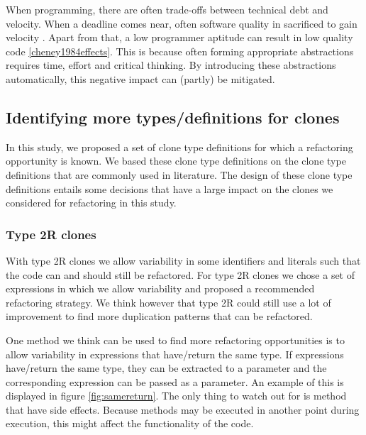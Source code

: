 When programming, there are often trade-offs between technical debt and velocity. When a deadline comes near, often software quality in sacrificed to gain velocity \cite{costello1984software, austin2001effects, shah2014global}. Apart from that, a low programmer aptitude can result in low quality code \ref{cheney1984effects}. This is because often forming appropriate abstractions requires time, effort and critical thinking. By introducing these abstractions automatically, this negative impact can (partly) be mitigated.

\subsection{Identifying more types/definitions for clones}
In this study, we proposed a set of clone type definitions for which a refactoring opportunity is known. We based these clone type definitions on the clone type definitions that are commonly used in literature. The design of these clone type definitions entails some decisions that have a large impact on the clones we considered for refactoring in this study.

\subsubsection{Type 2R clones}
With type 2R clones we allow variability in some identifiers and literals such that the code can and should still be refactored. For type 2R clones we chose a set of expressions in which we allow variability and proposed a recommended refactoring strategy. We think however that type 2R could still use a lot of improvement to find more duplication patterns that can be refactored.

One method we think can be used to find more refactoring opportunities is to allow variability in expressions that have/return the same type. If expressions have/return the same type, they can be extracted to a parameter and the corresponding expression can be passed as a parameter. An example of this is displayed in figure \ref{fig:samereturn}. The only thing to watch out for is method that have side effects. Because methods may be executed in another point during execution, this might affect the functionality of the code.

